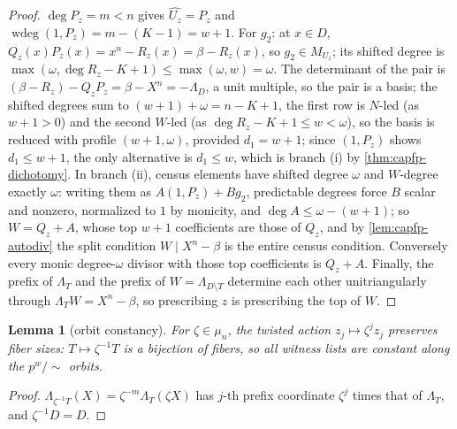 \documentclass[11pt]{article}
\newtheorem{lemma}[lemma]{Lemma}
\theoremstyle{definition}
\theoremstyle{remark}
\begin{document}
\begin{proof}
$\deg P_z=m<n$ gives $\widehat{U_z}=P_z$ and $\operatorname{wdeg}(1,P_z)=m-(K-1)=w+1$.  For $g_2$: at $x\in D$, $Q_z(x)P_z(x)=x^n-R_z(x)=\beta-R_z(x)$, so $g_2\in M_{U_z}$; its shifted degree is $\max(\omega,\deg R_z-K+1)\le\max(\omega,w)=\omega$.  The determinant of the pair is $(\beta-R_z)-Q_zP_z=\beta-X^n=-\Lambda_D$, a unit multiple, so the pair is a basis; the shifted degrees sum to $(w+1)+\omega=n-K+1$, the first row is $N$-led \textup(as $w+1>0$\textup) and the second $W$-led \textup(as $\deg R_z-K+1\le w<\omega$\textup), so the basis is reduced with profile $(w+1,\omega)$, provided $d_1=w+1$; since $(1,P_z)$ shows $d_1\le w+1$, the only alternative is $d_1\le w$, which is branch \textup{(i)} by \cref{thm:capfp-dichotomy}.  In branch \textup{(ii)}, census elements have shifted degree $\omega$ and $W$-degree exactly $\omega$: writing them as $A(1,P_z)+Bg_2$, predictable degrees force $B$ scalar and nonzero, normalized to $1$ by monicity, and $\deg A\le\omega-(w+1)$; so $W=Q_z+A$, whose top $w+1$ coefficients are those of $Q_z$, and by \cref{lem:capfp-autodiv} the split condition $W\mid X^n-\beta$ is the entire census condition.  Conversely every monic degree-$\omega$ divisor with those top coefficients is $Q_z+A$.  Finally, the prefix of $\Lambda_T$ and the prefix of $W=\Lambda_{D\setminus T}$ determine each other unitriangularly through $\Lambda_TW=X^n-\beta$, so prescribing $z$ is prescribing the top of $W$.
\end{proof}

\begin{lemma}[orbit constancy]\label{lem:capfp-orbit}
For $\zeta\in\mu_n$, the twisted action $z_j\mapsto\zeta^jz_j$ preserves fiber sizes: $T\mapsto\zeta^{-1}T$ is a bijection of fibers, so all witness lists are constant along the $p^w/\!\sim$ orbits.
\end{lemma}

\begin{proof}
$\Lambda_{\zeta^{-1}T}(X)=\zeta^{-m}\Lambda_T(\zeta X)$ has $j$-th prefix coordinate $\zeta^{j}$ times that of $\Lambda_T$, and $\zeta^{-1}D=D$.
\end{proof}
\end{document}
